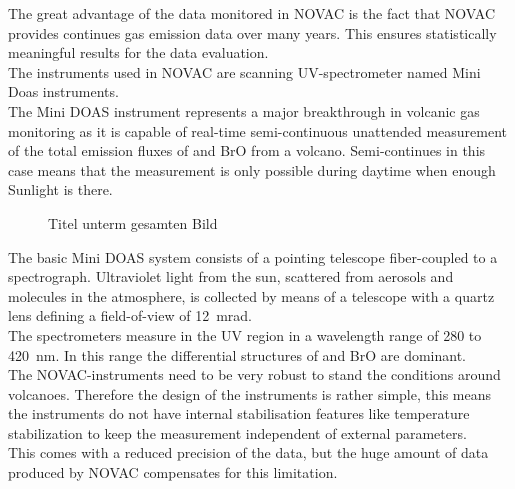 		The great advantage of the data monitored in NOVAC is the fact
		that NOVAC provides continues gas emission data over many years. This ensures statistically meaningful results for the data evaluation.\\
		The instruments used in NOVAC are scanning UV-spectrometer named Mini Doas instruments. \\
		The  Mini DOAS  instrument  represents  a  major  breakthrough  in  volcanic  gas	monitoring as it is capable of real-time semi-continuous unattended measurement of the total emission fluxes of   and BrO from a volcano. Semi-continues in this case means that the measurement is only possible during daytime when enough Sunlight is there.\\
		\begin{figure}
			\caption{Titel unterm gesamten Bild}
		\end{figure}
		The  basic  Mini DOAS  system  consists  of  a  pointing  telescope  fiber-coupled  to  a  spectrograph.  
		Ultraviolet light from the sun, scattered from aerosols and molecules in the atmosphere, is collected by 
		means  of  a  telescope  with  a  quartz  lens  defining  a  field-of-view  of  12~mrad.
		\cite{NOVACsite} \\
		The spectrometers measure in the UV region in a wavelength range of 280 to 420~nm. In this range the differential structures of  and BrO are dominant.
		\\
		The NOVAC-instruments need to be very robust to stand the conditions around volcanoes. Therefore the design of the instruments is rather simple, this means the instruments do not have internal stabilisation features like temperature stabilization to keep the measurement independent of external parameters.\\
		This comes with a reduced precision of the data, but the huge amount of data produced by NOVAC compensates for this limitation.  
		

